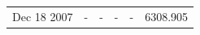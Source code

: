 \documentclass[a4paper,12pt]{article}
\begin{document}
\begin{table}
\begin{tabular}{rrrrrr}
                                                                                                                                                                                                                                                                                                                                                                                                                                                                                                                                                             Dec 18 2007 & -     & -     & -     & -     & 6308.905 \\
                                                                                                                                                                                                                                                                                                                                                                                                                                                                                                                                                                                                                                                                                                                                                                                                                                                                                                                                                                                                                                                                                                                                                                                                                                                                                                                                                                                                                                                                                                                                                                                                                                                                                                                                                                                                                                                                                                                                                                                                                                                                                                                                                                                                                                                                                                                                                                                                                                                                                                                                                                                                                                                                                                                             
\end{tabular}
\end{table}
\end{document}
